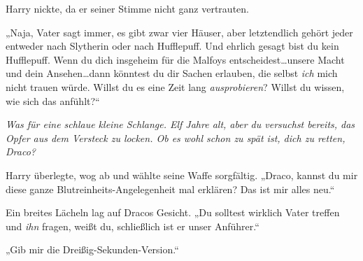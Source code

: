 Harry nickte, da er seiner Stimme nicht ganz vertrauten.

„Naja, Vater sagt immer, es gibt zwar vier Häuser, aber letztendlich gehört jeder entweder nach Slytherin oder nach Hufflepuff. Und ehrlich gesagt bist du kein Hufflepuff. Wenn du dich insgeheim für die Malfoys entscheidest…unsere Macht und dein Ansehen…dann könntest du dir Sachen erlauben, die selbst \emph{ich} mich nicht trauen würde. Willst du es eine Zeit lang \emph{ausprobieren}? Willst du wissen, wie sich das anfühlt?“

\emph{Was für eine schlaue kleine Schlange. Elf Jahre alt, aber du versuchst bereits, das Opfer aus dem Versteck zu locken. Ob es wohl schon zu spät ist, dich zu retten, Draco?}

Harry überlegte, wog ab und wählte seine Waffe sorgfältig. „Draco, kannst du mir diese ganze Blutreinheits-Angelegenheit mal erklären? Das ist mir alles neu.“

Ein breites Lächeln lag auf Dracos Gesicht. „Du solltest wirklich Vater treffen und \emph{ihn} fragen, weißt du, schließlich ist er unser Anführer.“

„Gib mir die Dreißig-Sekunden-Version.“%

